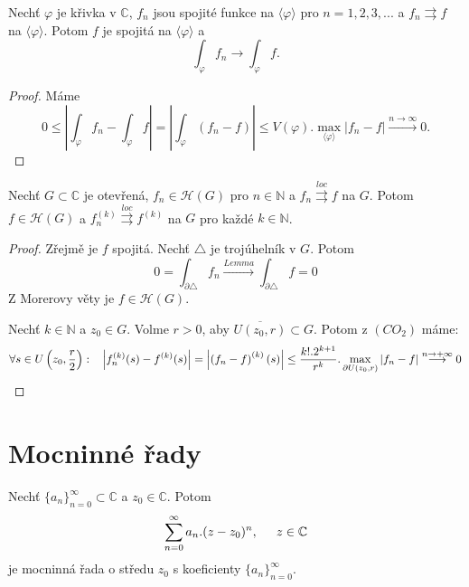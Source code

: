 \begin{lemma}
Nechť $\varphi$ je křivka v $\mathbb{C}$, $f_n$ jsou spojité funkce na $\langle\varphi\rangle$ pro $n=1,2,3,...$ a $f_n\rightrightarrows{f}$ na $\langle\varphi\rangle$. Potom $f$ je spojitá na $\langle\varphi\rangle$ a 
\[\int_\varphi{f_n}\longrightarrow\int_\varphi{f}.\]
\end{lemma}

\begin{proof}
Máme
\[0\leq\left\lvert{\int_\varphi{f_n}-\int_\varphi{f}}\right\lvert=
\left\lvert{\int_\varphi{(f_n-f)}}\right\lvert\leq{}
V(\varphi).\max_{\langle\varphi\rangle}{|f_n-f|}\overset{n\to\infty}{\longrightarrow}0.\]
\end{proof}

\begin{theorem}[Weierstrass]
Nechť $G\subset{\mathbb{C}}$ je otevřená, $f_n\in\mathcal{H}(G)$ pro $n\in\mathbb{N}$ a $f_n\overset{loc}{\rightrightarrows}f$ na $G$. Potom $f\in\mathcal{H}(G)$ a $f_n^{(k)}\overset{loc}{\rightrightarrows}f^{(k)}$ na $G$ pro každé $k\in\mathbb{N}$.
\end{theorem}

\begin{proof}
 Zřejmě je $f$ spojitá. Nechť $\triangle$ je trojúhelník v $G$. Potom 
\[0=\int_{\partial\triangle}{f_n}\overset{Lemma}{\longrightarrow}
\int_{\partial\triangle}{f}=0\]
Z Morerovy věty je $f\in\mathcal{H}(G)$.

 Nechť $k\in\mathbb{N}$ a $z_0\in{G}$. Volme $r>0$, aby $\overline{U(z_0,r)}\subset{G}$. Potom z $(CO_2)$ máme:
\[\forall{s\in{U\left(z_0,\frac{r}{2}\right)}}:\hspace{3mm}
{\left\lvert{f_n^{(k)}(s)-f^{(k)}(s)}\right\lvert}=
\left\lvert{\left({f_n-f}\right)^{(k)}(s)}\right\lvert\leq
\frac{k!.2^{k+1}}{r^k}.\max_{\partial{U(z_0,r)}}{|f_n-f|}
\overset{n\to+\infty}{\longrightarrow}0\]
\end{proof}

\section{\texorpdfstring{Mocninné řady}{Mocninné rady}}

\begin{definition}
Nechť $\{a_n\}_{n=0}^\infty\subset\mathbb{C}$ a $z_0\in\mathbb{C}$. Potom 
\begin{equation}
\sum_{n=0}^\infty{a_n.(z-z_0)^n}, \hspace{5mm} z\in\mathbb{C}
\label{eqn:rada}
\end{equation}
je mocninná řada o středu $z_0$ s koeficienty $\{a_n\}_{n=0}^\infty$.
\end{definition}

